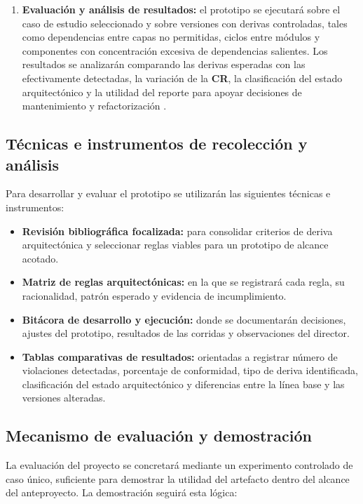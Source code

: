 \begin{enumerate}
    \item \textbf{Evaluación y análisis de resultados:} el prototipo se ejecutará sobre el caso de estudio seleccionado y sobre versiones con derivas controladas, tales como dependencias entre capas no permitidas, ciclos entre módulos y componentes con concentración excesiva de dependencias salientes. Los resultados se analizarán comparando las derivas esperadas con las efectivamente detectadas, la variación de la \textbf{CR}, la clasificación del estado arquitectónico y la utilidad del reporte para apoyar decisiones de mantenimiento y refactorización \parencite{Anthony2024, Sas2019}.
\end{enumerate}

\subsection{Técnicas e instrumentos de recolección y análisis}

Para desarrollar y evaluar el prototipo se utilizarán las siguientes técnicas e instrumentos:

\begin{itemize}
    \item \textbf{Revisión bibliográfica focalizada:} para consolidar criterios de deriva arquitectónica y seleccionar reglas viables para un prototipo de alcance acotado.
    \item \textbf{Matriz de reglas arquitectónicas:} en la que se registrará cada regla, su racionalidad, patrón esperado y evidencia de incumplimiento.
    \item \textbf{Bitácora de desarrollo y ejecución:} donde se documentarán decisiones, ajustes del prototipo, resultados de las corridas y observaciones del director.
    \item \textbf{Tablas comparativas de resultados:} orientadas a registrar número de violaciones detectadas, porcentaje de conformidad, tipo de deriva identificada, clasificación del estado arquitectónico y diferencias entre la línea base y las versiones alteradas.
\end{itemize}

\subsection{Mecanismo de evaluación y demostración}

La evaluación del proyecto se concretará mediante un experimento controlado de caso único, suficiente para demostrar la utilidad del artefacto dentro del alcance del anteproyecto. La demostración seguirá esta lógica:

